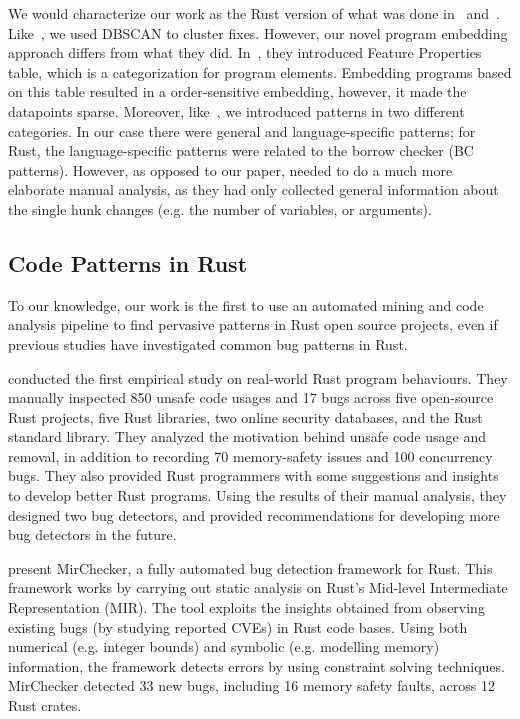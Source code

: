 We would characterize our work as the Rust version of what was done in~\cite{hanam2016discovering} and~\cite{yang2022mining}. Like~\cite{hanam2016discovering}, we used DBSCAN to cluster fixes. However, our novel program embedding approach differs from what they did. In~\cite{hanam2016discovering}, they introduced Feature Properties table, which is a categorization for program elements. Embedding programs based on this table resulted in a order-sensitive embedding, however, it made the datapoints sparse. Moreover, like~\cite{yang2022mining}, we introduced patterns in two different categories. In our case there were general and language-specific patterns; for Rust, the language-specific patterns were related to the borrow checker (BC patterns). However, as opposed to our paper, \cite{yang2022mining} needed to do a much more elaborate manual analysis, as they had only collected general information about the single hunk changes (e.g. the number of variables, or arguments).

\subsection{Code Patterns in Rust}

To our knowledge, our work is the first to use an automated mining and code analysis pipeline to find pervasive patterns in Rust open source projects, even if previous studies have investigated common bug patterns in Rust.

\cite{qin2020understanding} conducted the first empirical study on real-world Rust program behaviours. They manually inspected 850 unsafe code usages and 17 bugs across five open-source Rust projects, five Rust libraries, two online security databases, and the Rust standard library. They analyzed the motivation behind unsafe code usage and removal, in addition to recording 70 memory-safety issues and 100 concurrency bugs. They also provided Rust programmers with some suggestions and insights to develop better Rust programs. Using the results of their manual analysis, they designed two bug detectors, and provided recommendations for developing more bug detectors in the future.

\cite{li2021mirchecker} present MirChecker, a fully automated bug detection framework for Rust. This framework works by carrying out static analysis on Rust's Mid-level Intermediate Representation (MIR). The tool exploits the insights obtained from observing existing bugs (by studying reported CVEs) in Rust code bases. Using both numerical (e.g. integer bounds) and symbolic (e.g. modelling memory) information, the framework detects errors by using constraint solving techniques. MirChecker detected 33 new bugs, including 16 memory safety faults, across 12 Rust crates.

